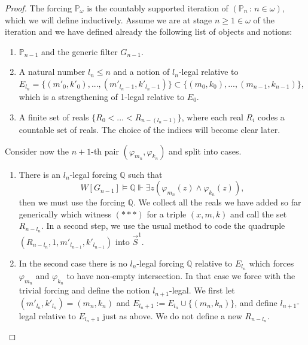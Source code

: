 \documentclass[10pt,a4paper]{amsart}
\newcommand{\forceP}{\mathbb{P}}
\newcommand{\forceQ}{\mathbb{Q}}
\begin{document}
\begin{proof}
The forcing $\forceP_{\omega}$ is the countably supported iteration of $(\forceP_n \, : \,n \in \omega)$, which we will define inductively.
Assume we are at stage $n  \ge 1 \in \omega$ of the iteration and we have defined already the following list of objects and notions:
\begin{enumerate}
\item $\forceP_{n-1}$ and the generic filter $G_{n-1}$.
\item A natural number $l_n \le n$ and a notion of $l_n$-legal relative to $E_{l_n}= \{ (m'_0,k'_0),...,(m'_{l_n-1},k'_{l_n-1}) \} \subset \{ (m_0,k_0),...,(m_{n-1},k_{n-1}) \} $, which is a strengthening of 1-legal relative to $E_0$.
\item A finite set of reals  $\{R_0<...<R_{n - (l_n -1)} \}$, where each real $R_i$ codes a countable set of reals. The choice of the indices will become clear later.

\end{enumerate}
Consider now the $n+1$-th pair $(\varphi_{m_n}, \varphi_{k_n})$ and split into cases.

\begin{enumerate}
\item[$(a)$] There is an $l_n$-legal forcing $\forceQ$ such that \[W[G_{n-1}] \models \forceQ \Vdash \exists z (\varphi_{m_n} (z) \land \varphi_{k_n} (z)), \] then we must use the forcing $\forceQ$. We collect all the reals we have added so far generically which witness $({\ast} {\ast} {\ast})$ for a triple $(x,m,k)$ and call the set $R_{n-l_n}$. In a second step, we use the usual method to code the quadruple $(R_{{n-l_n}}, 1,m'_{l_{n-1}},k'_{l_{n-1}} )$ into $\vec{S}^1$. 
\item[$(b)$] In the second case there is no $l_{n}$-legal forcing $\forceQ$ relative to $E_{l_n}$ which forces $\varphi_{m_n}$ and $\varphi_{k_n}$ to have non-empty intersection. In that case we force with the trivial forcing and define the notion $l_{n+1}$-legal. We first let $(m'_{l_n},k'_{l_n})=(m_n,k_n)$ and $E_{l_n +1}:= E_{l_n} \cup \{(m_n,k_n)\}$, and define $l_{n+1}$-legal relative to $E_{l_n+1}$ just as above. 
We  do not define a new $R_{n-l_n}$.
\end{enumerate}


\end{proof}
\end{document}
